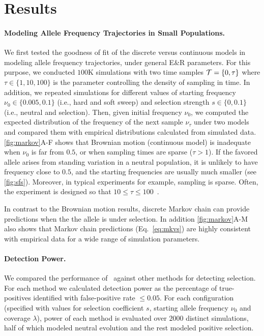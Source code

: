 \section{Results}
\paragraph{Modeling Allele Frequency Trajectories in Small Populations.} 
We first tested the goodness of fit of the discrete versus continuous models in 
modeling allele frequency trajectories, under general E\&R parameters.  For 
this 
purpose, we conducted $100$K
simulations with two time samples ${\cal T}=\{0,\tau\}$ where $\tau\in
\{1,10,100\}$ is the parameter controlling the density of sampling
in time.  In addition, we repeated simulations for different values of
starting frequency $\nu_0\in\{0.005,0.1\}$ (i.e., hard and soft sweep)
and selection strength $s\in\{0,0.1\}$ (i.e., neutral and
selection). Then, given initial frequency $\nu_0$, we computed
the expected distribution of the frequency of the next sample $\nu_\tau$
under two models and compared them with empirical distributions
calculated from simulated data.  \ref{fig:markov}A-F shows that
Brownian motion (continuous model) is inadequate when $\nu_0$ is
far from $0.5$, or when sampling times are sparse ($\tau>1$). If the
favored allele arises from standing variation in a neutral population,
it is unlikely to have frequency close to $0.5$, and the starting
frequencies are usually much smaller (see
\ref{fig:sfs}). Moreover, in typical \dmel experiments for
example, sampling is sparse. Often, the experiment is designed so that
$10\le\tau\le100$~\cite{kofler2013guide, orozco2012adaptation,
  zhou2011experimental,franssen2015patterns}.

In contrast to the Brownian motion results, discrete Markov chain can provide 
predictions when the the allele is under selection. In addition 
\ref{fig:markov}A-M
also shows that Markov chain predictions (Eq.~\ref{eq:mkvs}) are
highly consistent with empirical data for a wide range of simulation
parameters.

\paragraph{Detection Power.} 
We compared the performance of \comale\ against other methods for
detecting selection. For each method we calculated detection power as the 
percentage of true-positives identified with false-positive rate $\le 0.05$. For 
each
configuration (specified with values for selection coefficient $s$,
starting allele frequency $\nu_0$ and coverage $\lambda$), power of each method 
is evaluated over $2000$ distinct simulations, half of which modeled neutral 
evolution
and the rest modeled positive selection.



